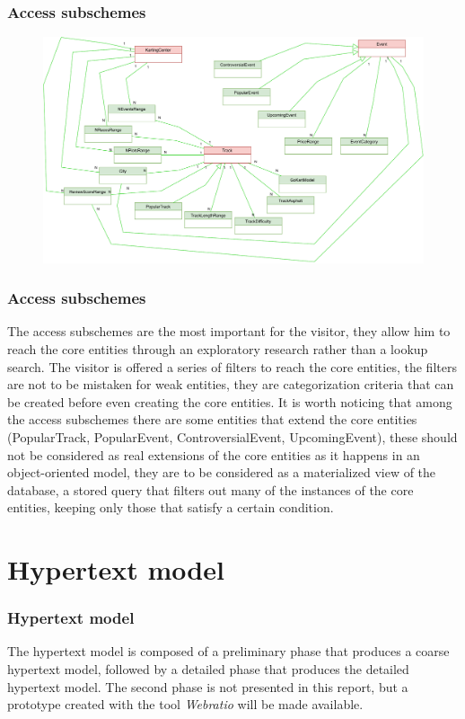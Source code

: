 \documentclass{beamer}
\begin{document}
\begin{frame}
    \frametitle{Access subschemes}
    \begin{figure}
        \centering
        \includegraphics[width=1\linewidth]{drawio/access-subschemes-cropped.pdf}
    \end{figure}
\end{frame}

\begin{frame}
    \frametitle{Access subschemes}
    \scriptsize
    The access subschemes are the most important for the visitor, they allow him to reach the core entities
    through an exploratory research rather than a lookup search. The visitor is offered a series of filters to reach the core entities,
    the filters are not to be mistaken for weak entities, they are categorization criteria that can be created before even creating
    the core entities. It is worth noticing that among the access subschemes there are some entities that extend the core entities
    (PopularTrack, PopularEvent, ControversialEvent, UpcomingEvent), these should not be considered as real extensions of the core entities 
    as it happens in an object-oriented model, they are to be considered as a materialized view of the database, a stored query that filters out
    many of the instances of the core entities, keeping only those that satisfy a certain condition.
\end{frame}

\section{Hypertext model}

\begin{frame}
    \frametitle{Hypertext model}
    The hypertext model is composed of a preliminary phase that produces a coarse hypertext model,
    followed by a detailed phase that produces the detailed hypertext model.
    The second phase is not presented in this report, but a prototype created with the tool \textit{Webratio} will be made available.
\end{frame}
\end{document}
